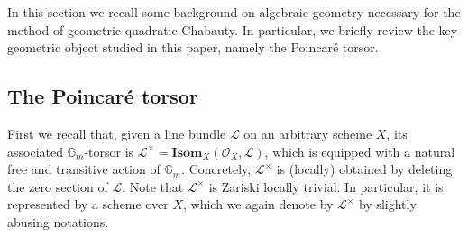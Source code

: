 \documentclass[11pt,oneside]{amsart}
\theoremstyle{plain}
\theoremstyle{definition}
\def\G{{\bf G}}
\DeclareMathOperator{\Gm}{\mathbb{G}_m}
\def\G{\mathbb{G}}
\def\Gm{{\mathbb{G}_m}}
\def\oh{\mathcal{O}}
\begin{document}
In this section we recall some background on algebraic geometry necessary for the method of geometric quadratic Chabauty. In particular, we briefly review the key geometric object studied in this paper, namely the Poincar\'e torsor. 


\subsection{The Poincar\'e torsor}\label{S:PicTors}

\color{black}

First we recall that, given a line bundle $\mathscr{L}$ on an arbitrary scheme $X$, its associated $\Gm$-torsor is $\mathscr{L}^\times = \textbf{Isom}_X (\oh_X, \mathscr L)$, which is equipped with a natural free and transitive  action of $\Gm$. Concretely, $\mathscr{L}^\times$ is (locally) obtained by deleting the zero section of $\mathscr L$. %
Note that $\mathscr L^\times$ is Zariski locally trivial. In particular, it is represented by a scheme over $X$, which we again denote by $\mathscr L^\times$ by slightly abusing notations. 
\end{document}
